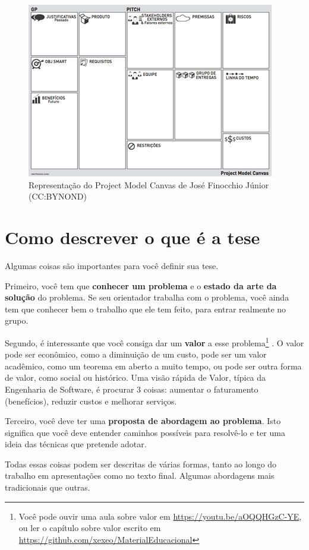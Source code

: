 \begin{figure}
    \centering
    \includegraphics[width=0.7\linewidth]{Images/PMC}
    \caption{Representação do Project Model Canvas de José Finocchio Júnior (CC:BYNOND)}
    \label{fig:pmc}
\end{figure}


\section{Como descrever o que é a tese}

Algumas coisas são importantes para você definir sua tese.

Primeiro, você tem que \textbf{conhecer um problema} e o \textbf{estado da arte da solução} do problema. Se seu orientador trabalha com o problema, você ainda tem que conhecer bem o trabalho que ele tem feito, para entrar realmente no grupo.

Segundo, é interessante que você consiga dar um \textbf{valor} a esse problema\footnote{Você pode ouvir uma aula sobre valor em \url{https://youtu.be/aOQQHGzC-YE}, ou ler o capítulo sobre valor escrito em \url{https://github.com/xexeo/MaterialEducacional}} . O valor pode ser econômico, como a diminuição de um custo, pode ser um valor acadêmico, como um teorema em aberto a muito tempo, ou pode ser outra forma de valor, como social ou histórico. Uma visão rápida de Valor, típica da Engenharia de Software, é procurar 3 coisas: aumentar o faturamento (benefícios), reduzir custos e melhorar serviços.

Terceiro, você deve ter uma \textbf{proposta de abordagem ao problema}. Isto significa que você deve entender caminhos possíveis para resolvê-lo e ter uma ideia das técnicas que pretende adotar.

Todas essas coisas podem ser descritas de várias formas, tanto ao longo do trabalho em apresentações como no texto final. Algumas abordagens mais tradicionais que outras.

